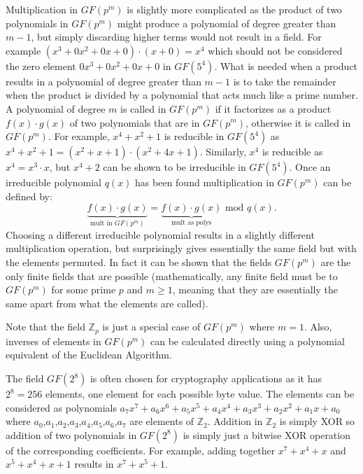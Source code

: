 Multiplication in $GF(p^m)$ is slightly more complicated as the product of
two polynomials in $GF(p^m)$ might produce a polynomial of degree greater
than $m-1$, but simply discarding higher terms would not result in a field.
For example $\left(x^3+0x^2+0x+0\right)\cdot\left(x+0\right)=x^4$
which should not be considered the zero element $0x^3+0x^2+0x+0$ in $GF(5^4)$.
What is needed when a product results in a polynomial of degree greater than $m-1$
is to take the remainder when the product is divided by a
polynomial that acts much like a prime number.
A polynomial of degree $m$ is called  in $GF(p^m)$ if it
factorizes as a product $f(x)\cdot g(x)$ of two
polynomials that are in $GF(p^m)$, otherwise it is called  in $GF(p^m)$.
For example, $x^4+x^2+1$ is reducible in $GF(5^4)$ as
$x^4+x^2+1=\left(x^2+x+1\right)\cdot\left(x^2+4x+1\right)$.
Similarly, $x^4$ is reducible as $x^4=x^3\cdot x$,
but $x^4+2$ can be shown to be irreducible in $GF(5^4)$.
Once an irreducible polynomial $q(x)$ has been found multiplication in $GF(p^m)$
can be defined by:
\begin{displaymath}
  \underbrace{f(x)\cdot g(x)}_{\mbox{mult in }GF(p^m)} =
  \underbrace{f(x)\cdot g(x)}_{\mbox{mult as polys}} \mbox{ mod } q(x).
\end{displaymath}
Choosing a different irreducible polynomial results in a slightly different
multiplication operation, but surprisingly gives essentially the same field
but with the elements permuted.
In fact it can be shown that the fields $GF(p^m)$
are the only finite fields that are possible
(mathematically, any finite field must be  to $GF(p^m)$
for some prime $p$ and $m\geq1$, meaning that they are essentially the
same apart from what the elements are called).

Note that the field $\mathbb{Z}_p$ is just a special case of $GF(p^m)$
where $m=1$.
Also, inverses of elements in $GF(p^m)$ can be calculated directly using
a polynomial equivalent of the Euclidean Algorithm.

The field $GF(2^8)$ is often chosen for cryptography applications
as it has $2^8=256$ elements, one element for each possible byte value.
The elements can be considered as polynomials
$a_7x^7+a_6x^6+a_5x^5+a_4x^4+a_3x^3+a_2x^2+a_1x+a_0$ where
$a_0$,$a_1$,$a_2$,$a_3$,$a_4$,$a_5$,$a_6$,$a_7$ are elements of $\mathbb{Z}_2$.
Addition in $\mathbb{Z}_2$ is simply XOR so addition of two polynomials in
$GF(2^8)$ is simply just a bitwise XOR operation of the corresponding coefficients.
For example, adding together $x^7+x^4+x$ and $x^5+x^4+x+1$ results in
$x^7+x^5+1$.


